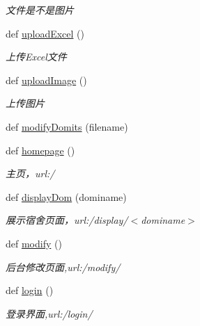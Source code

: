 \begin{DoxyCompactItemize}
\begin{DoxyCompactList}\small\item\em 文件是不是图片 \end{DoxyCompactList}\item 
def \mbox{\hyperlink{namespacemain_a7f709147939b2c6005d8efdddff85f7b}{upload\+Excel}} ()
\begin{DoxyCompactList}\small\item\em 上传\+Excel文件 \end{DoxyCompactList}\item 
def \mbox{\hyperlink{namespacemain_a3b88a9c9308bfa2308ae6cf744a63e4c}{upload\+Image}} ()
\begin{DoxyCompactList}\small\item\em 上传图片 \end{DoxyCompactList}\item 
def \mbox{\hyperlink{namespacemain_a8da19f25dec98a742cf10ab27b83bf73}{modify\+Domits}} (filename)
\item 
def \mbox{\hyperlink{group___xE8_xB7_xAF_xE7_x94_xB1_xE5_x87_xBD_xE6_x95_xB0_gab78667d84f4fdf0575af2adb306417c4}{homepage}} ()
\begin{DoxyCompactList}\small\item\em 主页，url\+:\textquotesingle{}/\textquotesingle{} \end{DoxyCompactList}\item 
def \mbox{\hyperlink{group___xE8_xB7_xAF_xE7_x94_xB1_xE5_x87_xBD_xE6_x95_xB0_ga037a19c20276c539ad0c761b8d54e36f}{display\+Dom}} (dominame)
\begin{DoxyCompactList}\small\item\em 展示宿舍页面，url\+:\textquotesingle{}/display/$<$dominame$>$\textquotesingle{} \end{DoxyCompactList}\item 
def \mbox{\hyperlink{group___xE8_xB7_xAF_xE7_x94_xB1_xE5_x87_xBD_xE6_x95_xB0_gac7ef9122c03a3279b6d1d904f4a16150}{modify}} ()
\begin{DoxyCompactList}\small\item\em 后台修改页面,url\+:\textquotesingle{}/modify/\textquotesingle{} \end{DoxyCompactList}\item 
def \mbox{\hyperlink{group___xE8_xB7_xAF_xE7_x94_xB1_xE5_x87_xBD_xE6_x95_xB0_ga4a5118733a16e40bc747937152312ab0}{login}} ()
\begin{DoxyCompactList}\small\item\em 登录界面,url\+:\textquotesingle{}/login/\textquotesingle{} \end{DoxyCompactList}\item 

\end{DoxyCompactItemize}
